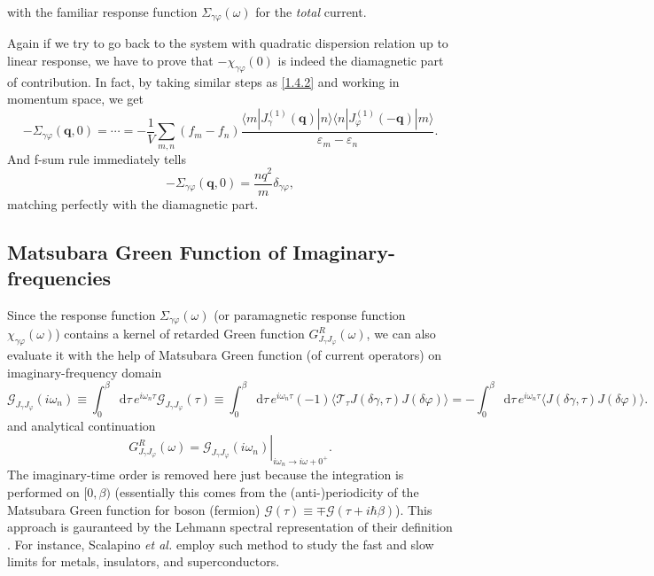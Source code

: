 \documentclass[10pt,nofootinbib,letterpaper]{revtex4}
\newcommand*\dd{\mathop{}\!\mathrm{d}}
\begin{document}
		with the familiar response function $\Sigma_{\gamma\varphi}(\omega)$ for the \emph{total} current.\par
		\indent Again if we try to go back to the system with quadratic dispersion relation up to linear response, we have to prove that $-\chi_{\gamma\varphi}(0)$ is indeed the diamagnetic part of contribution. In fact, by taking similar steps as \eqref{1.4.2} and working in momentum space, we get
		\begin{equation}\label{2.2.10}
			-\Sigma_{\gamma\varphi}(\bm{q},0)=\cdots=-\dfrac{1}{V}\sum_{m,n}(f_m-f_n)\dfrac{\langle m|J_\gamma^{(1)}(\bm{q})|n\rangle\langle n|J_\varphi^{(1)}(\bm{-q})|m\rangle}{\varepsilon_m-\varepsilon_n}.
		\end{equation}
		And f-sum rule immediately tells
		\begin{equation}\label{2.2.11}
			-\Sigma_{\gamma\varphi}(\bm{q},0)=\dfrac{nq^2}{m}\delta_{\gamma\varphi},
		\end{equation}
		matching perfectly with the diamagnetic part.

	\subsection{Matsubara Green Function of Imaginary-frequencies}
		Since the response function $\Sigma_{\gamma\varphi}(\omega)$ (or paramagnetic response function $\chi_{\gamma\varphi}(\omega)$) contains a kernel of retarded Green function $G^R_{J_\gamma J_\varphi}(\omega)$, we can also evaluate it with the help of Matsubara Green function (of current operators) on imaginary-frequency domain
		\begin{equation*}
			\mathcal{G}_{J_\gamma J_\varphi}(i\omega_n)\equiv\int_0^\beta\dd\tau\,e^{i\omega_n\tau}\mathcal{G}_{J_\gamma J_\varphi}(\tau)\equiv\int_0^\beta\dd\tau\,e^{i\omega_n\tau}(-1)\langle\mathcal{T}_\tau J(\delta\gamma,\tau) J(\delta\varphi)\rangle=-\int_0^\beta\dd\tau\,e^{i\omega_n\tau}\langle J(\delta\gamma,\tau) J(\delta\varphi)\rangle.
		\end{equation*}
		and analytical continuation
		\begin{equation*}
			G^R_{J_\gamma J_\varphi}(\omega)=\left.\mathcal{G}_{J_\gamma J_\varphi}(i\omega_n)\right|_{i\omega_n \rightarrow i\omega+0^+}.
		\end{equation*}
		The imaginary-time order is removed here just because the integration is performed on $[0,\beta)$ (essentially this comes from the (anti-)periodicity of the Matsubara Green function for boson (fermion) $\mathcal{G}(\tau)\equiv\mp\mathcal{G}(\tau+i\hbar\beta)$). This approach is gauranteed by the Lehmann spectral representation of their definition \cite{abrikosov2012methods,mahanmany}. For instance, Scalapino \textit{et al.} \cite{scalapino1993insulator} employ such method to study the fast and slow limits for metals, insulators, and superconductors.
\end{document}

